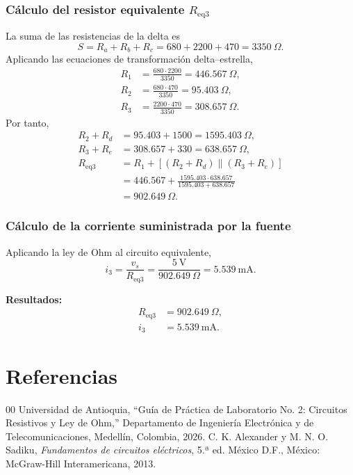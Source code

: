 \documentclass[conference,10pt]{IEEEtran}
\begin{document}
\subsubsection{Cálculo del resistor equivalente $R_{\mathrm{eq}3}$}
La suma de las resistencias de la delta es
\begin{equation}
  S=R_a+R_b+R_c=680+2200+470=3350~\Omega.
\end{equation}
Aplicando las ecuaciones de transformación delta--estrella,
\begin{align}
  R_1&=\frac{680\cdot2200}{3350}=446.567~\Omega,\\
  R_2&=\frac{680\cdot470}{3350}=95.403~\Omega,\\
  R_3&=\frac{2200\cdot470}{3350}=308.657~\Omega.
\end{align}
Por tanto,
\begin{align}
  R_2+R_d&=95.403+1500=1595.403~\Omega,\\
  R_3+R_e&=308.657+330=638.657~\Omega,\\
  R_{\mathrm{eq}3}
    &=R_1+\left[(R_2+R_d)\parallel(R_3+R_e)\right] \\
    &=446.567+\frac{1595.403\cdot638.657}{1595.403+638.657} \\
    &=902.649~\Omega.
\end{align}

\subsubsection{Cálculo de la corriente suministrada por la fuente}
Aplicando la ley de Ohm al circuito equivalente,
\begin{equation}
  i_3=\frac{v_s}{R_{\mathrm{eq}3}}
      =\frac{5~\mathrm{V}}{902.649~\Omega}
      =5.539~\mathrm{mA}.
\end{equation}

\noindent\textbf{Resultados:}
\begin{align*}
  R_{\mathrm{eq}3} &= 902.649~\Omega,\\
  i_3 &= 5.539~\mathrm{mA}.
\end{align*}

\section{Referencias}
\begin{thebibliography}{00}
  Universidad de Antioquia, ``Guía de Práctica de Laboratorio No. 2: Circuitos Resistivos y Ley de Ohm,'' Departamento de Ingeniería Electrónica y de Telecomunicaciones, Medellín, Colombia, 2026.
  C. K. Alexander y M. N. O. Sadiku, \emph{Fundamentos de circuitos eléctricos}, 5.ª ed. México D.F., México: McGraw-Hill Interamericana, 2013.
\end{thebibliography}
\end{document}

